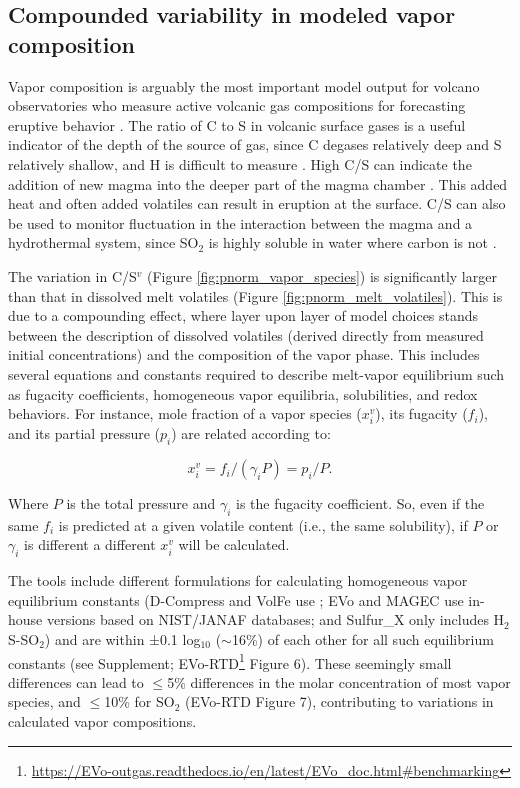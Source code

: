 \documentclass[draft, english]{volcanica-template}
\begin{document}
\subsection{Compounded variability in modeled vapor composition}
\label{sec:vaporcompositiondiscussion}
Vapor composition is arguably the most important model output for volcano observatories who measure active volcanic gas compositions for forecasting eruptive behavior \parencite{Aiuppa2007,demoor2016turmoil,Kern2022}. The ratio of C to S in volcanic surface gases is a useful indicator of the depth of the source of gas, since C degases relatively deep and S relatively shallow, and H is difficult to measure \parencite{Aiuppa2007,demoor2016turmoil,Ding2025,Giggenbach1996,iacovino2015,Kern2022,burton2007role}. High C/S can indicate the addition of new magma into the deeper part of the magma chamber \parencite{Ding2025,Aiuppa2007,demoor2016turmoil}. This added heat and often added volatiles can result in eruption at the surface. C/S can also be used to monitor fluctuation in the interaction between the magma and a hydrothermal system, since SO$_2$ is highly soluble in water where carbon is not \parencite{deMoor2016short,stix2018understanding,demoor2016turmoil}.

The variation in C/S$^v$ (Figure \ref{fig:pnorm_vapor_species}) is significantly larger than that in dissolved melt volatiles (Figure \ref{fig:pnorm_melt_volatiles}). This is due to a compounding effect, where layer upon layer of model choices stands between the description of dissolved volatiles (derived directly from measured initial concentrations) and the composition of the vapor phase. This includes several equations and constants required to describe melt-vapor equilibrium such as fugacity coefficients, homogeneous vapor equilibria, solubilities, and redox behaviors. For instance, mole fraction of a vapor species ($x^v_i$), its fugacity ($f_i$), and its partial pressure ($p_i$) are related according to:

\begin{equation} 
    x^v_i=f_i/(\gamma_iP)=p_i/P.
    \label{eq:P-f-y}
\end{equation}

\noindent Where $P$ is the total pressure and $\gamma_i$ is the fugacity coefficient. So, even if the same $f_i$ is predicted at a given volatile content (i.e., the same solubility), if $P$ or $\gamma_i$ is different a different $x^v_i$ will be calculated. 

The tools include different formulations for calculating homogeneous vapor equilibrium constants (D-Compress and VolFe use \textcite{ohmoto1977}; EVo and MAGEC use in-house versions based on NIST/JANAF databases; and Sulfur\_X only includes H$_2$S-SO$_2$) and are within ±0.1 log$_{10}$ ($\sim$16\%) of each other for all such equilibrium constants (see Supplement; EVo-RTD\footnote{\url{https://EVo-outgas.readthedocs.io/en/latest/EVo_doc.html\#benchmarking}} Figure 6). These seemingly small differences can lead to $\leq$5\% differences in the molar concentration of most vapor species, and $\leq$10\% for SO$_2$ (EVo-RTD Figure 7), contributing to variations in calculated vapor compositions.
\end{document}
